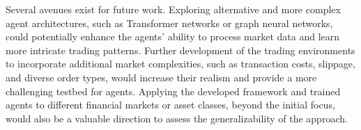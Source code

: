 \documentclass{IEEEtran}
\begin{document}
Several avenues exist for future work. Exploring alternative and more complex agent architectures, such as Transformer networks or graph neural networks, could potentially enhance the agents' ability to process market data and learn more intricate trading patterns. Further development of the trading environments to incorporate additional market complexities, such as transaction costs, slippage, and diverse order types, would increase their realism and provide a more challenging testbed for agents. Applying the developed framework and trained agents to different financial markets or asset classes, beyond the initial focus, would also be a valuable direction to assess the generalizability of the approach.
%
\end{document}
